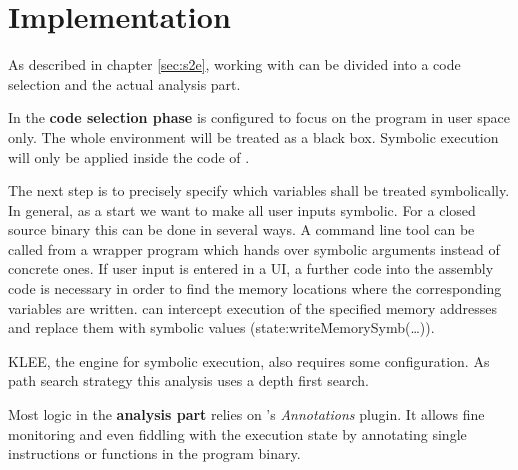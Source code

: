 \section{Implementation}\label{sec:impl}

As described in chapter \ref{sec:s2e}, working with \sse can be divided into a code selection and the actual analysis part.

In the \textbf{code selection phase} \sse is configured to focus on the program \app in user space only.
The whole environment will be treated as a black box.
Symbolic execution will only be applied inside the code of \app.

The next step is to precisely specify which variables shall be treated symbolically.
In general, as a start we want to make all user inputs symbolic.
For a closed source binary this can be done in several ways.
A command line tool can be called from a wrapper program which hands over symbolic arguments instead of concrete ones.
If user input is entered in a UI, a further code into the assembly code is necessary in order to find the memory locations where the corresponding variables are written.
\sse can intercept execution of the specified memory addresses and replace them with symbolic values (state:writeMemorySymb(\ldots)).

KLEE, the engine for symbolic execution, also requires some configuration.
As path search strategy this analysis uses a depth first search.

\bigskip

Most logic in the \textbf{analysis part} relies on \sse's \textit{Annotations} plugin.
It allows fine monitoring and even fiddling with the execution state by annotating single instructions or functions in the program binary.



\iffalse
§5 	Implementation (of the test case using S2E)
		> Vorgehen
		> Verwendete Konsistenzmodelle
		> Arbeitsweise von Selektoren/Analysatoren
\fi